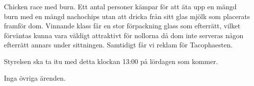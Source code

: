 \documentclass{protokoll}
\begin{document}
Chicken race med burn. Ett antal personer kämpar för att äta upp en mängd burn med en mängd nachochips utan att dricka från sitt glas mjölk som placerats framför dom. Vinnande klass får en stor förpackning glass som efterrätt, vilket förväntas kunna vara väldigt attraktivt för nollorna då dom inte serveras någon efterrätt annars under sittningen.
Samtidigt får vi reklam för Tacophaesten.

Styrelsen ska ta itu med detta klockan 13:00 på lördagen som kommer.

Inga övriga ärenden.
\end{document}
